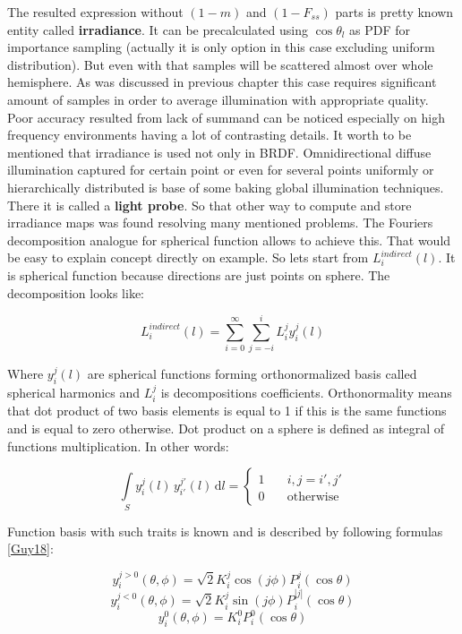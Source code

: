 The resulted expression without $(1-m)$ and $(1-F_{ss})$ parts is pretty known entity called {\bfseries irradiance}. It can be precalculated using $\cos\theta_l$ as P\+DF for importance sampling (actually it is only option in this case excluding uniform distribution). But even with that samples will be scattered almost over whole hemisphere. As was discussed in previous chapter this case requires significant amount of samples in order to average illumination with appropriate quality. Poor accuracy resulted from lack of summand can be noticed especially on high frequency environments having a lot of contrasting details. It worth to be mentioned that irradiance is used not only in B\+R\+DF. Omnidirectional diffuse illumination captured for certain point or even for several points uniformly or hierarchically distributed is base of some baking global illumination techniques. There it is called a {\bfseries light probe}. So that other way to compute and store irradiance maps was found resolving many mentioned problems. The Fourier\textquotesingle{}s decomposition analogue for spherical function allows to achieve this. That would be easy to explain concept directly on example. So lets start from $L_i^{indirect}(l)$. It is spherical function because directions are just points on sphere. The decomposition looks like\+:

\[L_i^{indirect}(l) = \sum_{i = 0}^\infty \sum_{j=-i}^i L_i^j y_i^j(l)\]

Where $y_i^j(l)$ are spherical functions forming orthonormalized basis called spherical harmonics and $L_i^j$ is decompositions coefficients. Orthonormality means that dot product of two basis elements is equal to 1 if this is the same functions and is equal to zero otherwise. Dot product on a sphere is defined as integral of functions multiplication. In other words\+:

\[\int\limits_S y_i^j(l)\, y_{i'}^{j'}(l)\, \mathrm{d}l = \begin{cases} 1 & \quad i,j = i',j' \\ 0 & \quad \mathrm{otherwise}\end{cases}\]

Function basis with such traits is known and is described by following formulas \mbox{[}\hyperlink{specification__pbr_math_Guy18}{Guy18}\mbox{]}\+:

\[y_i^{j > 0}(\theta, \phi) = \sqrt{2}K_i^j\cos(j\phi)P_i^j(\cos\theta)\] \[y_i^{j<0}(\theta, \phi) = \sqrt{2}K_i^j\sin(j\phi)P_i^{|j|}(\cos\theta)\] \[y_i^0(\theta, \phi) = K_i^0P_i^0(\cos\theta)\]

